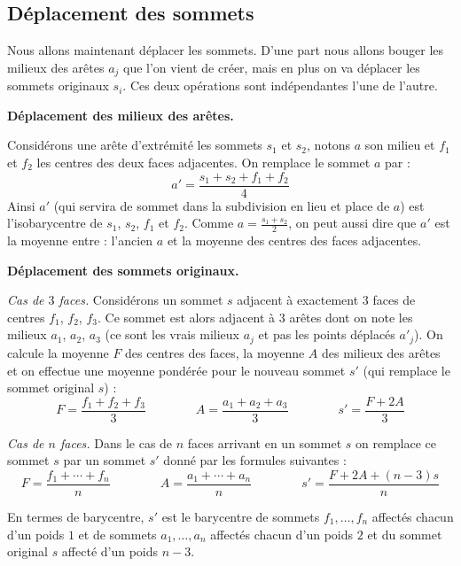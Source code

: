 \documentclass[11pt,class=report,crop=false]{standalone}
\begin{document}
\subsection{Déplacement des sommets}

Nous allons maintenant déplacer les sommets. D'une part nous allons bouger les milieux des arêtes $a_j$ que l'on vient de créer, mais en plus on va déplacer les sommets originaux $s_i$. Ces deux opérations sont indépendantes l'une de l'autre.

\textbf{Déplacement des milieux des arêtes.}

Considérons une arête d'extrémité les sommets $s_1$ et $s_2$, notons $a$ son milieu et $f_1$ et $f_2$ les centres des deux faces adjacentes. On remplace le sommet $a$ par :
$$a' = \frac{s_1+s_2+f_1+f_2}{4}$$
Ainsi $a'$ (qui servira de sommet dans la subdivision en lieu et place de $a$) est l'isobarycentre de $s_1$, $s_2$, $f_1$ et $f_2$. Comme $a= \frac{s_1+s_2}{2}$, on peut aussi dire que $a'$ est la moyenne entre : l'ancien $a$ et la moyenne des centres des faces adjacentes.


 
\bigskip


\textbf{Déplacement des sommets originaux.}

\emph{Cas de $3$ faces.}
Considérons un sommet $s$ adjacent à exactement $3$ faces de centres $f_1$, $f_2$, $f_3$.
Ce sommet est alors adjacent à $3$ arêtes dont on note les milieux $a_1$, $a_2$, $a_3$ (ce sont les vrais milieux $a_j$ et pas les points déplacés $a'_j$).
On calcule la moyenne $F$ des centres des faces, la moyenne $A$ des milieux des arêtes et on effectue une moyenne pondérée pour le nouveau sommet $s'$ (qui remplace le sommet original $s$) :
$$F = \frac{f_1+f_2+f_3}{3}
 \qquad\qquad
 A = \frac{a_1+a_2+a_3}{3}
 \qquad\qquad 
 s' = \frac{F + 2A}{3}$$
 
 

\emph{Cas de $n$ faces.} 
Dans le cas de $n$ faces arrivant en un sommet $s$ on remplace ce sommet $s$ par un sommet $s'$ donné par les formules suivantes :
 $$F = \frac{f_1+\cdots+f_n}{n}
\qquad\qquad
A = \frac{a_1+\cdots+a_n}{n}
\qquad\qquad
s' = \frac{F + 2A + (n-3)s}{n}$$

En termes de barycentre, $s'$ est le barycentre de sommets $f_1,\ldots,f_n$ affectés chacun d'un poids $1$ et de sommets $a_1,\ldots,a_n$ affectés chacun d'un poids $2$ et du sommet original $s$ affecté d'un poids $n-3$.
\end{document}
